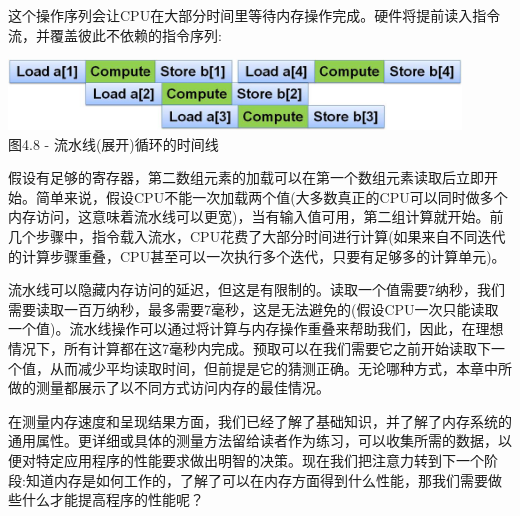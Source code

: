这个操作序列会让CPU在大部分时间里等待内存操作完成。硬件将提前读入指令流，并覆盖彼此不依赖的指令序列:

\begin{center}
\includegraphics[width=0.9\textwidth]{content/1/chapter4/images/8.jpg}\\
图4.8 - 流水线(展开)循环的时间线
\end{center}

假设有足够的寄存器，第二数组元素的加载可以在第一个数组元素读取后立即开始。简单来说，假设CPU不能一次加载两个值(大多数真正的CPU可以同时做多个内存访问，这意味着流水线可以更宽)，当有输入值可用，第二组计算就开始。前几个步骤中，指令载入流水，CPU花费了大部分时间进行计算(如果来自不同迭代的计算步骤重叠，CPU甚至可以一次执行多个迭代，只要有足够多的计算单元)。

流水线可以隐藏内存访问的延迟，但这是有限制的。读取一个值需要7纳秒，我们需要读取一百万纳秒，最多需要7毫秒，这是无法避免的(假设CPU一次只能读取一个值)。流水线操作可以通过将计算与内存操作重叠来帮助我们，因此，在理想情况下，所有计算都在这7毫秒内完成。预取可以在我们需要它之前开始读取下一个值，从而减少平均读取时间，但前提是它的猜测正确。无论哪种方式，本章中所做的测量都展示了以不同方式访问内存的最佳情况。

在测量内存速度和呈现结果方面，我们已经了解了基础知识，并了解了内存系统的通用属性。更详细或具体的测量方法留给读者作为练习，可以收集所需的数据，以便对特定应用程序的性能要求做出明智的决策。现在我们把注意力转到下一个阶段:知道内存是如何工作的，了解了可以在内存方面得到什么性能，那我们需要做些什么才能提高程序的性能呢？
















